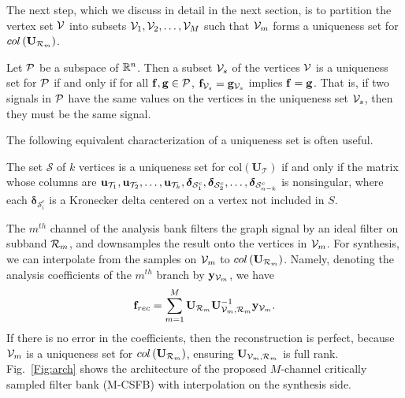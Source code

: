 \documentclass[journal, 10pt]{IEEEtran}
\begin{document}
The next step, which we discuss in detail in the next section, is to partition the vertex set ${\mathcal{V}}$ into subsets ${\mathcal{V}}_1,{\mathcal{V}}_2,\ldots,{\mathcal{V}}_M$ such that ${\mathcal{V}}_m$ forms a uniqueness set for $\mbox{col}\left(\mathbf{U}_{{\cal R}_m}\right)$.
\begin{definition}[Uniqueness set \cite{pesenson_paley}] 
Let ${\cal P}$ be a subspace of $\mathbb{R}^n$. 
Then a subset ${\mathcal{V}}_s$ of the vertices ${\mathcal{V}}$ is a uniqueness set for 
${\cal P}$ if  and only if for all %
${\bf f},{\bf g} \in {\cal P}$,
${\bf f}_{{\mathcal{V}}_s}={\bf g}_{{\mathcal{V}}_s}$ implies ${\bf f}={\bf g}$. That is, if two signals in ${\cal P}$ have the same values on the vertices in the uniqueness set ${\mathcal{V}}_s$, then they must be the same signal.
\end{definition}
The following equivalent characterization of a uniqueness set is often useful.
\begin{lemma}\label{Le:eq_uniq}
The set $\mathcal{S}$ of $k$ vertices is a uniqueness set for $\mbox{col}({\mathbf{U}}_{\mathcal T})$ if and only if the matrix whose columns are ${\bf u}_{{\mathcal T}_1},{\bf u}_{{\mathcal T}_2},\ldots,{\bf u}_{{\mathcal T}_k}, {\boldsymbol \delta}_{{\mathcal{S}}^c_1}, {\boldsymbol \delta}_{{\mathcal{S}}^c_2}, \ldots, {\boldsymbol \delta}_{{\mathcal{S}}^c_{n-k}}$ is nonsingular,
where each ${\boldsymbol \delta}_{{\mathcal{S}}^c_i}$ is a Kronecker delta centered on a vertex not included in $S$. 
\end{lemma}
The $m^{th}$ channel of the analysis %
bank %
filters the graph signal by an ideal %
filter on subband ${\cal R}_m$, and downsamples the result onto the vertices in ${\mathcal{V}}_m$. For synthesis, we can interpolate from the samples on ${\mathcal{V}}_m$ to $\mbox{col}\left(\mathbf{U}_{{\cal R}_m}\right)$. Namely, denoting the analysis coefficients of the $m^{th}$ branch by ${\bf y}_{{\mathcal{V}}_m}$, we have
\begin{align} \label{Eq:synth}
{\bf f}_{rec} = \sum_{m=1}^M  \mathbf{U}_{{\cal R}_m} \mathbf{U}_{\V_m,{\cal R}_m}^{-1} {\bf y}_{\V_m}.
\end{align}
If there is no error in the coefficients, then the reconstruction is perfect, because ${\mathcal{V}}_m$ is a uniqueness set for $\mbox{col}\left(\mathbf{U}_{{\cal R}_m}\right)$, ensuring $\mathbf{U}_{\V_m,{\cal R}_m}$ is full rank. Fig.\ \ref{Fig:arch} shows the architecture of the proposed $M$-channel critically sampled filter bank (M-CSFB) with interpolation on the synthesis side.
\end{document}
